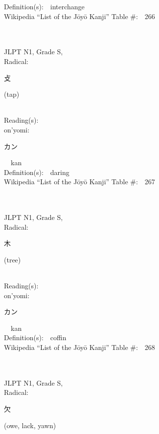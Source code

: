 \begin{multicols}{2}
Definition(s):\ \ interchange \\
Wikipedia ``List of the J\=oy\=o Kanji'' Table \#:\ \ 266 \\
\ \ \\
{\fontsize{34pt}{40pt}  }\ \ \\
{JLPT N1, Grade S, \\Radical:\ \ {\begin{CJK}{UTF8}{min} 攴 \end{CJK}} (tap) } \\
Reading(s):\ \ \\
{\hspace*{1em}}on'yomi:\ \ \\
{\hspace*{2em}}{\begin{CJK}{UTF8}{min} カン \end{CJK}}\ \ kan\ \ \\
Definition(s):\ \ daring \\
Wikipedia ``List of the J\=oy\=o Kanji'' Table \#:\ \ 267 \\
\ \ \\
{\fontsize{34pt}{40pt}  }\ \ \\
{JLPT N1, Grade S, \\Radical:\ \ {\begin{CJK}{UTF8}{min} 木 \end{CJK}} (tree) } \\
Reading(s):\ \ \\
{\hspace*{1em}}on'yomi:\ \ \\
{\hspace*{2em}}{\begin{CJK}{UTF8}{min} カン \end{CJK}}\ \ kan\ \ \\
Definition(s):\ \ coffin \\
Wikipedia ``List of the J\=oy\=o Kanji'' Table \#:\ \ 268 \\
\ \ \\
{\fontsize{34pt}{40pt}  }\ \ \\
{JLPT N1, Grade S, \\Radical:\ \ {\begin{CJK}{UTF8}{min} 欠 \end{CJK}} (owe, lack, yawn) } \\

\end{multicols}
